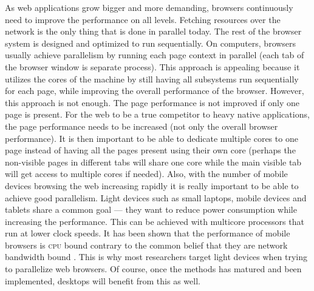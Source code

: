 \documentclass[a4paper,11pt]{kth-mag}
\begin{document}
        As web applications grow bigger and more demanding, browsers continuously need to improve the performance on all levels.
        Fetching resources over the network is the only thing that is done in parallel today.
        The rest of the browser system is designed and optimized to run sequentially.
        On computers, browsers usually achieve parallelism by running each page context in parallel (each tab of the browser window is separate process).
        This approach is appealing because it utilizes the cores of the machine by still having all subsystems run sequentially for each page, while improving the overall performance of the browser.
        However, this approach is not enough.
        The page performance is not improved if only one page is present.
        For the web to be a true competitor to heavy native applications, the page performance needs to be increased (not only the overall browser performance).
        It is then important to be able to dedicate multiple cores to one page instead of having all the pages present using their own core (perhaps the non-visible pages in different tabs will share one core while the main visible tab will get access to multiple cores if needed).
        Also, with the number of mobile devices browsing the web increasing rapidly it is really important to be able to achieve good parallelism.
        Light devices such as small laptops, mobile devices and tablets share a common goal --- they want to reduce power consumption while increasing the performance.
        This can be achieved with multicore processors that run at lower clock speeds.
        It has been shown that the performance of mobile browsers is \textsc{cpu} bound contrary to the common belief that they are network bandwidth bound \cite{parallelizing_the_web_browser}.
        This is why most researchers target light devices when trying to parallelize web browsers.
        Of course, once the methods has matured and been implemented, desktops will benefit from this as well.
\end{document}
